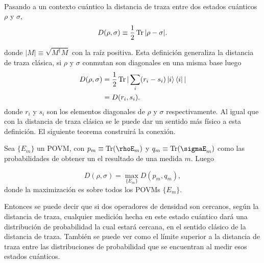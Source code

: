 \\
Pasando a un contexto cuántico la distancia de traza entre dos estados cuánticos $\rho$ y $\sigma$,
\begin{equation}
D(\rho,\sigma) \equiv \frac{1}{2} \Tr |\rho-\sigma|.	
\end{equation}

donde $|M| \equiv \sqrt{M^{\dagger}M}$ con la raíz positiva. Esta definición generaliza la distancia de traza clásica, si $\rho$ y $\sigma$ conmutan son diagonales en una misma base luego
\begin{align*}
D(\rho,\sigma) &= \frac{1}{2} \Tr |\sum_{i} (r_{i}-s_{i})\ket{i}\bra{i}|\\
\quad &= D(r_{i},s_{i}).
\end{align*}
donde $r_{i}$ y $s_{i}$ son los elementos diagonales de $\rho$ y $\sigma$ respectivamente. Al igual que con la distancia de traza clásica se le puede dar un sentido más físico a esta definición. El siguiente teorema construirá la conexión.
\begin{theorem}
Sea $\{ E_{m}\}$ un POVM, con $p_{m} \equiv \Tr(\rhoE_{m})$ y $q_{m}\equiv \Tr(\sigmaE_{m})$ como las probabilidades de obtener un el resultado de una medida $m$. Luego

\begin{equation}
D(\rho,\sigma)= \max_{ \{ E_{m}\} } D(p_{m},q_{m}),
\end{equation}
donde la maximización es sobre todos los POVMs $\{ E_{m}\}$.
\end{theorem}
Entonces se puede decir que si dos operadores de densidad son cercanos, según la distancia de traza, cualquier medición hecha en este estado cuántico dará una distribución de probabilidad la cual estará cercana, en el sentido clásico de la distancia de traza. También se puede ver como el límite superior a la distancia de traza entre las distribuciones de probabilidad que se encuentran al medir esos estados cuánticos.

